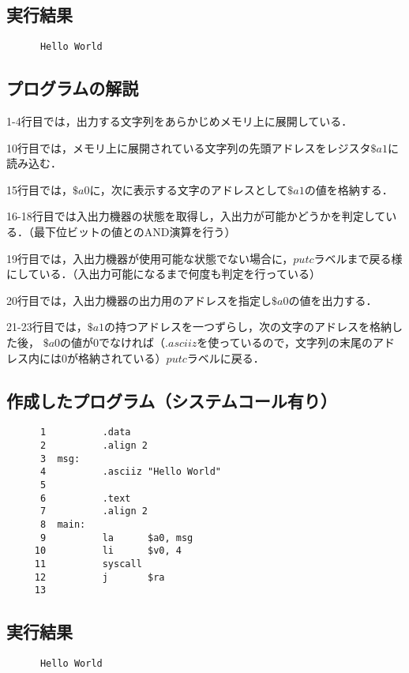 \documentclass[a4j,11pt]{jarticle}
\begin{document}
\subsection{実行結果}

\begin{verbatim}
      Hello World      
\end{verbatim}

\subsection{プログラムの解説}
1-4行目では，出力する文字列をあらかじめメモリ上に展開している．

10行目では，メモリ上に展開されている文字列の先頭アドレスをレジスタ$\$a1$に読み込む．

15行目では，$\$a0$に，次に表示する文字のアドレスとして$\$a1$の値を格納する．

16-18行目では入出力機器の状態を取得し，入出力が可能かどうかを判定している．（最下位ビットの値とのAND演算を行う）

19行目では，入出力機器が使用可能な状態でない場合に，$putc$ラベルまで戻る様にしている．（入出力可能になるまで何度も判定を行っている）

20行目では，入出力機器の出力用のアドレスを指定し$\$a0$の値を出力する．

21-23行目では，$\$a1$の持つアドレスを一つずらし，次の文字のアドレスを格納した後，
$\$a0$の値が$0$でなければ（$.asciiz$を使っているので，文字列の末尾のアドレス内には$0$が格納されている）$putc$ラベルに戻る．

\subsection{作成したプログラム（システムコール有り）}

\begin{verbatim}
      1          .data
      2          .align 2
      3  msg:
      4          .asciiz "Hello World"
      5
      6          .text
      7          .align 2
      8  main:
      9          la      $a0, msg
     10          li      $v0, 4
     11          syscall
     12          j       $ra
     13          
\end{verbatim}
\subsection{実行結果}

\begin{verbatim}
      Hello World      
\end{verbatim}
\end{document}
